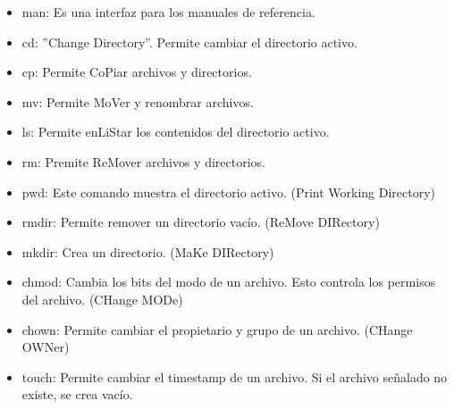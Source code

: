 			\begin{itemize}

				\item man: \newline
				Es una interfaz para los manuales de referencia.
				
				\item cd:\newline
				''Change Directory''. Permite cambiar el directorio activo.
				
				\item cp:\newline
				Permite CoPiar archivos y directorios.
				
				\item mv: \newline
				Permite MoVer y renombrar archivos.
				
				\item ls: \newline
				Permite enLiStar los contenidos del directorio activo.
				
				\item rm: \newline
				Premite ReMover archivos y directorios.
				
				\item pwd: \newline
				Este comando muestra el directorio activo. (Print Working Directory)
				
				\item rmdir: \newline
				Permite remover un directorio vacío. (ReMove DIRectory)
				
				\item mkdir: \newline
				Crea un directorio. (MaKe DIRectory)
				
				\item chmod: \newline
				Cambia los bits del modo de un archivo. Esto controla los permisos del archivo. (CHange MODe)
				
				\item chown: \newline
				Permite cambiar el propietario y grupo de un archivo. (CHange OWNer)
				
				\item touch: \newline
				Permite cambiar el timestamp de un archivo. Si el archivo señalado no existe, se crea vacío.				
				

\end{itemize}
